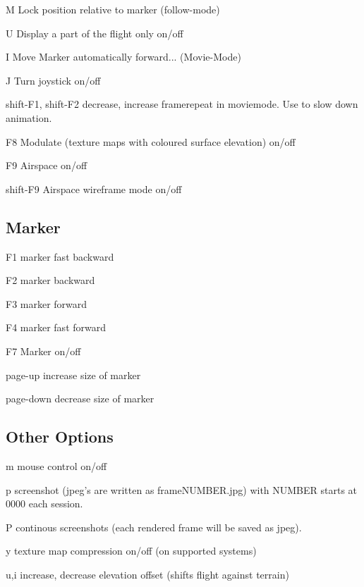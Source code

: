 \begin{keys}
\item[M]        Lock position relative to marker (follow-mode)
\item[U]        Display a part of the flight only  on/off
\item[I]        Move Marker automatically forward... (Movie-Mode)
\item[J]        Turn joystick on/off

\item[shift-F1, shift-F2]
        decrease, increase framerepeat  in moviemode. Use to slow down animation.

\item[F8]       Modulate (texture maps with coloured surface elevation) on/off
\item[F9]       Airspace on/off
\item[shift-F9] Airspace wireframe mode on/off
\end{keys}


\subsection*{Marker}

\begin{keys}
\item[F1]       marker fast backward
\item[F2]       marker backward
\item[F3]       marker forward
\item[F4]       marker fast forward
\item[F7]       Marker on/off
\item[page-up]  increase size of marker
\item[page-down] decrease size of marker
\end{keys}


\subsection*{Other Options}

\begin{keys}
\item[m]        mouse control on/off
\item[p]        screenshot (jpeg's are written as frameNUMBER.jpg)
        with NUMBER starts at 0000 each session.

\item[P]        continous screenshots
        (each rendered frame will be saved as jpeg).

\item[y]        texture map compression on/off (on supported systems)

\item[u,i]      increase, decrease elevation offset
        (shifts flight against terrain)
\end{keys}


